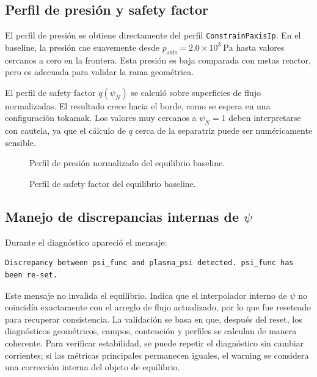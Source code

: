 \documentclass[11pt,a4paper]{article}
\begin{document}
\subsection{Perfil de presión y safety factor}
El perfil de presión se obtiene directamente del perfil \texttt{ConstrainPaxisIp}. En el baseline,
la presión cae suavemente desde $p_{\mathrm{axis}}=2.0\times10^3~\mathrm{Pa}$ hasta valores
cercanos a cero en la frontera. Esta presión es baja comparada con metas reactor, pero es
adecuada para validar la rama geométrica.

El perfil de safety factor $q(\psi_N)$ se calculó sobre superficies de flujo normalizadas. El
resultado crece hacia el borde, como se espera en una configuración tokamak. Los valores muy
cercanos a $\psi_N=1$ deben interpretarse con cautela, ya que el cálculo de $q$ cerca de la
separatriz puede ser numéricamente sensible.

\begin{figure}[htbp]
\centering
{}
\caption{Perfil de presión normalizado del equilibrio baseline.}
\label{fig:pressure_profile_placeholder}
\end{figure}

\begin{figure}[htbp]
\centering
{}
\caption{Perfil de safety factor del equilibrio baseline.}
\label{fig:q_profile_placeholder}
\end{figure}

\subsection{Manejo de discrepancias internas de $\psi$}
Durante el diagnóstico apareció el mensaje:

\begin{verbatim}
Discrepancy between psi_func and plasma_psi detected. psi_func has been re-set.
\end{verbatim}

Este mensaje no invalida el equilibrio. Indica que el interpolador interno de $\psi$ no coincidía
exactamente con el arreglo de flujo actualizado, por lo que fue reseteado para recuperar
consistencia. La validación se basa en que, después del reset, los diagnósticos geométricos,
campos, contención y perfiles se calculan de manera coherente. Para verificar estabilidad, se
puede repetir el diagnóstico sin cambiar corrientes; si las métricas principales permanecen
iguales, el warning se considera una corrección interna del objeto de equilibrio.
\end{document}
